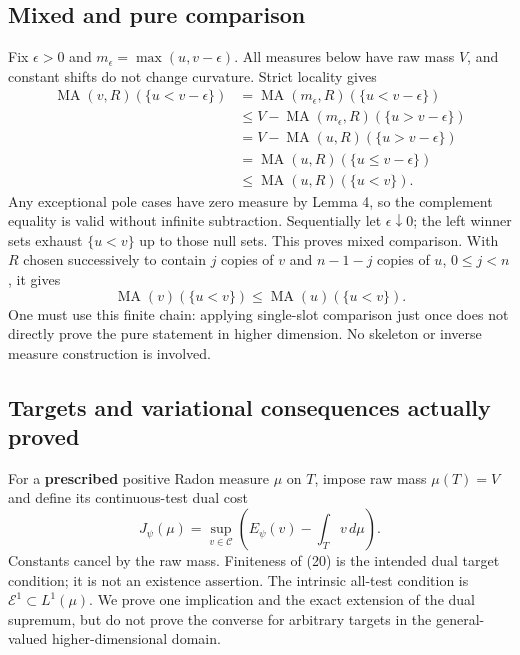 \documentclass[
]{article}
\begin{document}
\subsection{Mixed and pure comparison}\label{mixed-and-pure-comparison}

Fix \(\epsilon>0\) and \(m_\epsilon=\max(u,v-\epsilon)\). All measures
below have raw mass \(V\), and constant shifts do not change curvature.
Strict locality gives \[
\begin{split}
\operatorname{MA}(v,R)(\{u<v-\epsilon\})
&=\operatorname{MA}(m_\epsilon,R)(\{u<v-\epsilon\})\\
&\leq V-\operatorname{MA}(m_\epsilon,R)(\{u>v-\epsilon\})\\
&=V-\operatorname{MA}(u,R)(\{u>v-\epsilon\})\\
&=\operatorname{MA}(u,R)(\{u\leq v-\epsilon\})\\
&\leq\operatorname{MA}(u,R)(\{u<v\}).
\end{split}\tag{18}
\] Any exceptional pole cases have zero measure by Lemma 4, so the
complement equality is valid without infinite subtraction. Sequentially
let \(\epsilon\downarrow0\); the left winner sets exhaust \(\{u<v\}\) up
to those null sets. This proves mixed comparison. With \(R\) chosen
successively to contain \(j\) copies of \(v\) and \(n-1-j\) copies of
\(u\), \(0\leq j<n\), it gives \[
\operatorname{MA}(v)(\{u<v\})\leq\operatorname{MA}(u)(\{u<v\}).
\tag{19}
\] One must use this finite chain: applying single-slot comparison just
once does not directly prove the pure statement in higher dimension. No
skeleton or inverse measure construction is involved.

\subsection{Targets and variational consequences actually
proved}\label{targets-and-variational-consequences-actually-proved}

For a \textbf{prescribed} positive Radon measure \(\mu\) on \(T\),
impose raw mass \(\mu(T)=V\) and define its continuous-test dual cost \[
J_\psi(\mu)=\sup_{v\in\mathcal C}\left(E_\psi(v)-\int_Tv\,d\mu\right).
\tag{20}
\] Constants cancel by the raw mass. Finiteness of (20) is the intended
dual target condition; it is not an existence assertion. The intrinsic
all-test condition is \(\mathcal E^1\subset L^1(\mu)\). We prove one
implication and the exact extension of the dual supremum, but do not
prove the converse for arbitrary targets in the general-valued
higher-dimensional domain.
\end{document}

